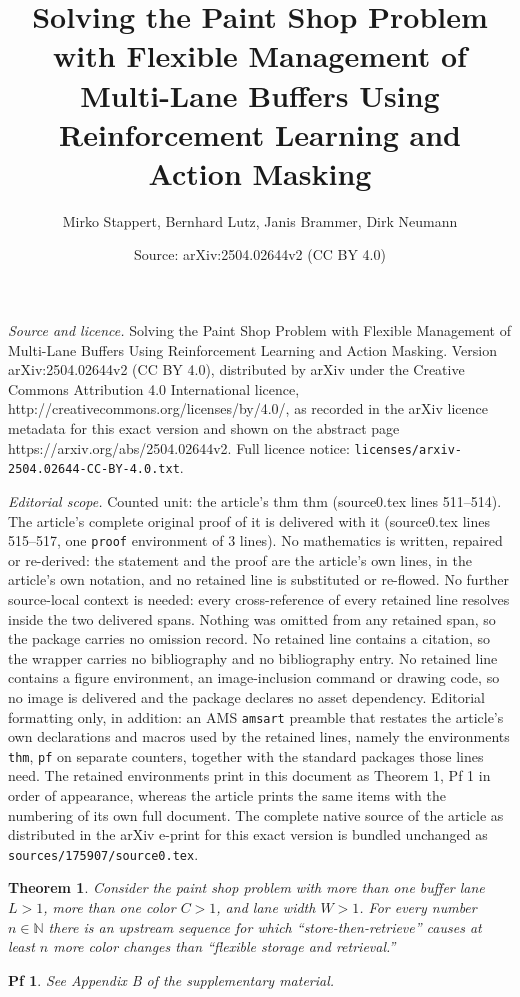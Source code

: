 \documentclass[10pt,a4paper]{amsart}
\title{Solving the Paint Shop Problem with Flexible Management of Multi-Lane Buffers Using Reinforcement Learning and Action Masking}
\author{Mirko Stappert, Bernhard Lutz, Janis Brammer, Dirk Neumann}
\date{Source: arXiv:2504.02644v2 (CC BY 4.0)}
\newtheorem{thm}{Theorem}
\newtheorem{pf}{Pf}
\begin{document}
\maketitle

\noindent\emph{Source and licence.} Solving the Paint Shop Problem with Flexible Management of Multi-Lane Buffers Using Reinforcement Learning and Action Masking. Version arXiv:2504.02644v2 (CC BY 4.0), distributed by arXiv under the Creative Commons Attribution 4.0 International licence, http://creativecommons.org/licenses/by/4.0/, as recorded in the arXiv licence metadata for this exact version and shown on the abstract page https://arxiv.org/abs/2504.02644v2. Full licence notice: \texttt{licenses/arxiv-2504.02644-CC-BY-4.0.txt}.\par\smallskip

\noindent\textit{Editorial scope.} Counted unit: the article's thm thm (source0.tex lines 511--514). The article's complete original proof of it is delivered with it (source0.tex lines 515--517, one \texttt{proof} environment of 3 lines). No mathematics is written, repaired or re-derived: the statement and the proof are the article's own lines, in the article's own notation, and no retained line is substituted or re-flowed.  No further source-local context is needed: every cross-reference of every retained line resolves inside the two delivered spans.  Nothing was omitted from any retained span, so the package carries no omission record.  No retained line contains a citation, so the wrapper carries no bibliography and no bibliography entry.  No retained line contains a figure environment, an image-inclusion command or drawing code, so no image is delivered and the package declares no asset dependency.  Editorial formatting only, in addition: an AMS \texttt{amsart} preamble that restates the article's own declarations and macros used by the retained lines, namely the environments \texttt{thm}, \texttt{pf} on separate counters, together with the standard packages those lines need.  The retained environments print in this document as Theorem 1, Pf 1 in order of appearance, whereas the article prints the same items with the numbering of its own full document.  The complete native source of the article as distributed in the arXiv e-print for this exact version is bundled unchanged as \texttt{sources/175907/source0.tex}.
\begin{thm}
Consider the paint shop problem with more than one buffer lane $L > 1$, more than one color $C>1$, and lane width $W > 1$. 
For every number $n\in \mathbb{N}$ there is an upstream sequence for which ``store-then-retrieve'' causes at least $n$ more color changes than ``flexible storage and retrieval.''
\end{thm}

\begin{pf}
See Appendix B of the supplementary material.
\end{pf}
\end{document}
